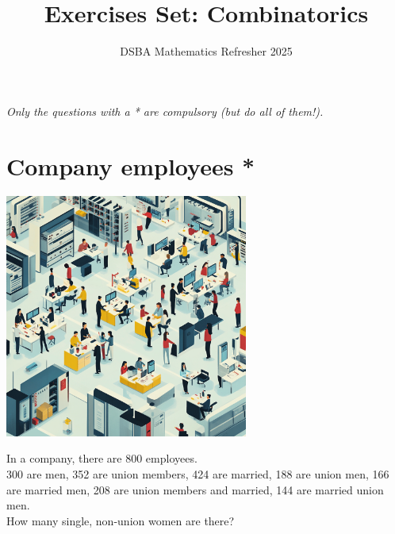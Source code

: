 \documentclass[]{article}
\title{Exercises Set: Combinatorics}
\author{DSBA Mathematics Refresher 2025}
\date{}
\begin{document}
	
	\maketitle
	
	\begin{center}
		\textit{Only the questions with a * are compulsory (but do all of them!).}
	\end{center}
	
	\section{Company employees *}
	\begin{center}
		\includegraphics[height=8cm]{company.png}
	\end{center}
	In a company, there are 800 employees.\\
	300 are men, 352 are union members, 424 are married, 188 are union men, 166 are married men, 208 are union members and married, 144 are married union men.\\
	How many single, non-union women are there?
	
\end{document}

